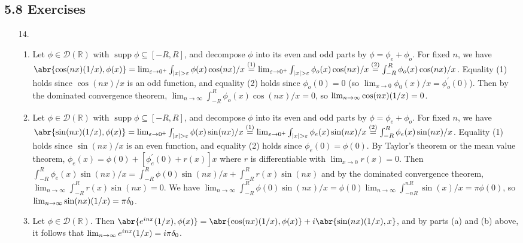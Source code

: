 \documentclass[11pt,leqno]{article}
\theoremstyle{plain}
\theoremstyle{definition}
\numberwithin{equation}{section}
\numberwithin{lem}{section}
\newcommand{\eq}[1]{\overset{(#1)}{=}}
\DeclareMathOperator{\supp}{supp}
\let\PV\relax
\DeclareMathOperator{\PV}{PV}
\begin{document}
\subsection*{5.8 Exercises}
\begin{enumerate}
    \item[14.] \begin{enumerate}
      \item Let $\phi\in \mathcal D(\mathbb R)$ with $\supp \phi\subseteq [-R,R]$, and decompose $\phi$ into its even and odd parts by $\phi = \phi_e + \phi_o$.
      For fixed $n$, we have $\abr{\cos(nx)\PV(1/x), \phi(x)}= \lim_{\varepsilon\to 0^+}\int_{\abs{x}>\varepsilon}\phi(x)\cos(nx)/x \eq{1} \lim_{\varepsilon\to 0^+}\int_{\abs{x}>\varepsilon}\phi_o(x)\allowbreak\cos(nx)/x \eq{2}\int_{-R}^{R}\phi_o(x)\cos(nx)/x$.
      Equality (1) holds since $\cos(nx)/x$ is an odd function, and equality (2) holds since $\phi_o(0) = 0$ (so $\lim_{x\to 0}\phi_0(x)/x = \phi_o^\prime(0)$). Then by the dominated convergence theorem, $\lim_{n\to\infty}\int_{-R}^{R}\phi_o(x)\cos(nx)/x = 0$, so $\lim_{n\to\infty}\cos(nx)\PV(1/x)= 0$.
      \item Let $\phi\in \mathcal D(\mathbb R)$ with $\supp \phi\subseteq [-R,R]$, and decompose $\phi$ into its even and odd parts by $\phi = \phi_e + \phi_o$.
      For fixed $n$, we have $\abr{\sin(nx)\PV(1/x), \phi(x)}= \lim_{\varepsilon\to 0^+}\int_{\abs{x}>\varepsilon}\phi(x)\sin(nx)/x\eq{1} \lim_{\varepsilon\to 0^+}\int_{\abs{x}>\varepsilon}\phi_e(x)\allowbreak\sin(nx)/x\eq{2} \int_{-R}^{R}\phi_e(x)\sin(nx)/x$. Equality (1) holds since $\sin(nx)/x$ is an even function, and equality (2) holds since $\phi_e(0) = \phi(0)$. By Taylor's theorem or the mean value theorem, $\phi_e(x) = \phi(0) + [\phi_e^\prime(0)+r(x)]x$ where $r$ is differentiable with $\lim_{x\to 0}r(x) = 0$. Then $\int_{-R}^{R}\phi_e(x)\sin(nx)/x = \int_{-R}^{R}\phi(0)\sin(nx)/x + \int_{-R}^{R}r(x)\sin(nx)$ and by the dominated convergence theorem, $\lim_{n\to\infty}\int_{-R}^{R}r(x)\sin(nx) = 0$. We have $\lim_{n\to\infty}\int_{-R}^{R}\phi(0)\sin(nx)/x = \phi(0)\lim_{n\to\infty}\int_{-nR}^{nR}\sin(x)/x = \pi\phi(0)$, so $\lim_{n\to\infty}\sin(nx)\PV(1/x)= \pi\delta_0$.
      \item Let $\phi\in \mathcal D(\mathbb R)$. Then $\abr{e^{inx}\PV(1/x),\phi(x)} = \abr{\cos(nx)\PV(1/x),\phi(x)} + i\abr{\sin(nx)\PV(1/x),x}$, and by parts (a) and (b) above, it follows that $\lim_{n\to\infty}e^{inx}\PV(1/x) = i\pi\delta_0$.
    \end{enumerate}

\end{enumerate}
\end{document}
